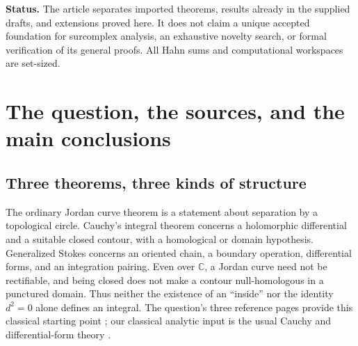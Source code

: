 \documentclass[11pt,letterpaper]{article}
\theoremstyle{definition}
\theoremstyle{remark}
\newcommand{\C}{\mathbb C}\newcommand{\R}{\mathbb R}\newcommand{\Q}{\mathbb Q}\newcommand{\Z}{\mathbb Z}\newcommand{\N}{\mathbb N}
\numberwithin{equation}{section}
\begin{document}
\begin{titlepage}
\begin{minipage}{0.94\textwidth}
\begin{abstract}
These constructions recover the supplied manuscripts' Cauchy and moving-residue theorems, resolve individual infinitesimal poles by changes of scale, and realize one-variable radius-free Hahn-germ residues on sufficiently small actual parametrized circles. We also give a several-variable torus realization under an explicit dominating-coordinate-power hypothesis. Algebraic winding and residue integration provide an alternative for rational functions on semialgebraic loops. Root-of-unity sampling reveals precisely why coefficientwise contour recovery need not be a Schnirelman limit, especially in higher valuation rank. Berkovich, tropical, perfectoid, tame, and surreal extension theories are compared without identifying their distinct integration targets.
\end{abstract}
\end{minipage}
\vfill
\begin{minipage}{0.94\textwidth}\small
\textbf{Status.} The article separates imported theorems, results already in the supplied drafts, and extensions proved here. It does not claim a unique accepted foundation for surcomplex analysis, an exhaustive novelty search, or formal verification of its general proofs. All Hahn sums and computational workspaces are set-sized.
\end{minipage}
\end{titlepage}
\begingroup\small\setlength{\parskip}{0pt}\tableofcontents\endgroup\newpage

\section{The question, the sources, and the main conclusions}\label{sec:intro}
\subsection{Three theorems, three kinds of structure}
The ordinary Jordan curve theorem is a statement about separation by a topological circle. Cauchy's integral theorem concerns a holomorphic differential and a suitable closed contour, with a homological or domain hypothesis. Generalized Stokes concerns an oriented chain, a boundary operation, differential forms, and an integration pairing. Even over $\C$, a Jordan curve need not be rectifiable, and being closed does not make a contour null-homologous in a punctured domain. Thus neither the existence of an ``inside'' nor the identity $d^2=0$ alone defines an integral. The question's three reference pages provide this classical starting point \cite{WikiJordan,WikiCauchy,WikiStokes}; our classical analytic input is the usual Cauchy and differential-form theory \cite{Ahlfors,Spivak}.
\end{document}
